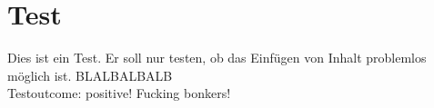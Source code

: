 \chapter*{Test}
Dies ist ein Test. Er soll nur testen, ob das Einfügen von Inhalt problemlos möglich ist.
BLALBALBALB
\\
Testoutcome: positive! Fucking bonkers!